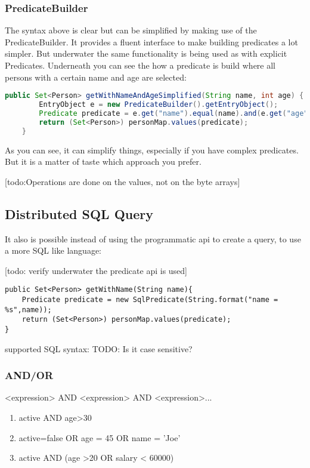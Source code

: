 \subsubsection{PredicateBuilder}
The syntax above is clear but can be simplified by making use of the PredicateBuilder. It provides a fluent interface to make building predicates a lot simpler. But underwater the same functionality is being used as with explicit Predicates. Underneath you can see the how a predicate is build where all persons with a certain name and age are selected:
\begin{lstlisting}[language=java]
    public Set<Person> getWithNameAndAgeSimplified(String name, int age) {
        EntryObject e = new PredicateBuilder().getEntryObject();
        Predicate predicate = e.get("name").equal(name).and(e.get("age").equal(age));
        return (Set<Person>) personMap.values(predicate);
    }
\end{lstlisting}
As you can see, it can simplify things, especially if you have complex predicates. But it is a matter of taste which approach you prefer.

[todo:Operations are done on the values, not on the byte arrays]

\subsection{Distributed SQL Query}
It also is possible instead of using the programmatic api to create a query, to use a more SQL like language:

[todo: verify underwater the predicate api is used]

\begin{lstlisting}
public Set<Person> getWithName(String name){
    Predicate predicate = new SqlPredicate(String.format("name = %s",name));
    return (Set<Person>) personMap.values(predicate);
}
\end{lstlisting}

supported SQL syntax:
TODO: Is it case sensitive?

\subsubsection{AND/OR}
<expression> AND <expression> AND <expression>...
\begin{enumerate}
\item active AND age>30
\item active=false OR age = 45 OR name = 'Joe'
\item active AND (age >20 OR salary < 60000)
\end{enumerate}

